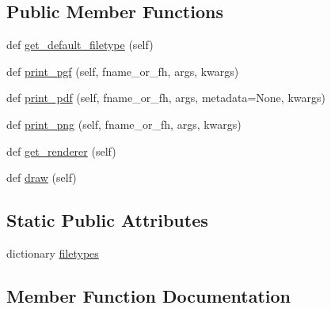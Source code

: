 \subsection*{Public Member Functions}
\begin{DoxyCompactItemize}
\item 
def \hyperlink{classmatplotlib_1_1backends_1_1backend__pgf_1_1FigureCanvasPgf_add1fa7ee0bd62b0a5225ba29af649669}{get\+\_\+default\+\_\+filetype} (self)
\item 
def \hyperlink{classmatplotlib_1_1backends_1_1backend__pgf_1_1FigureCanvasPgf_ab62bc288c8aa6083defe6e03722dde4a}{print\+\_\+pgf} (self, fname\+\_\+or\+\_\+fh, args, kwargs)
\item 
def \hyperlink{classmatplotlib_1_1backends_1_1backend__pgf_1_1FigureCanvasPgf_a14e177d82c537bc5901631506648438b}{print\+\_\+pdf} (self, fname\+\_\+or\+\_\+fh, args, metadata=None, kwargs)
\item 
def \hyperlink{classmatplotlib_1_1backends_1_1backend__pgf_1_1FigureCanvasPgf_ad283ebba2a19c1ef2a6bdf26e0b7f026}{print\+\_\+png} (self, fname\+\_\+or\+\_\+fh, args, kwargs)
\item 
def \hyperlink{classmatplotlib_1_1backends_1_1backend__pgf_1_1FigureCanvasPgf_a24066a37c91507c117428f5f807d4f56}{get\+\_\+renderer} (self)
\item 
def \hyperlink{classmatplotlib_1_1backends_1_1backend__pgf_1_1FigureCanvasPgf_ac336d7eab0237558c5936fa8836c699b}{draw} (self)
\end{DoxyCompactItemize}
\subsection*{Static Public Attributes}
\begin{DoxyCompactItemize}
\item 
dictionary \hyperlink{classmatplotlib_1_1backends_1_1backend__pgf_1_1FigureCanvasPgf_a6f453463be210b7714ab8f90ffed2f05}{filetypes}
\end{DoxyCompactItemize}


\subsection{Member Function Documentation}
\mbox{\label{classmatplotlib_1_1backends_1_1backend__pgf_1_1FigureCanvasPgf_ac336d7eab0237558c5936fa8836c699b}} 
